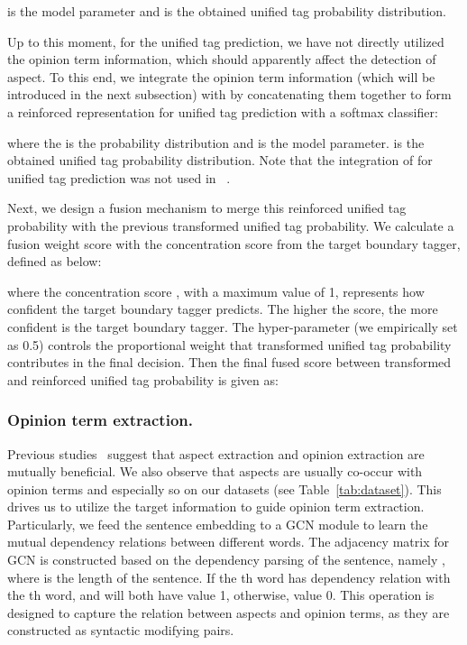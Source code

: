 \documentclass[letterpaper]{article} \usepackage{aaai20}  \usepackage{times}  \usepackage{helvet} \usepackage{courier}  \usepackage[hyphens]{url}  \usepackage{graphicx} \urlstyle{rm} \def\UrlFont{\rm}  \usepackage{graphicx}  \frenchspacing  \setlength{\pdfpagewidth}{8.5in}  \setlength{\pdfpageheight}{11in}
\newcommand{\citet}[1]
{\citeauthor{#1}~\shortcite{#1}}
\begin{document}
 is the model parameter and  is the obtained unified tag probability distribution.


Up to this moment, for the unified tag prediction, we have not directly utilized the opinion term information, which should apparently affect the detection of aspect. To this end, we integrate the opinion term information  (which will be introduced in the next subsection) with   by concatenating them together to form a reinforced representation  for unified tag prediction with a softmax classifier:

where the  is the probability distribution and  is the model parameter.  is the obtained unified tag probability distribution. Note that the integration of  for unified tag prediction was not used in \citet{li2019unified}.



Next, we design a fusion mechanism to merge this reinforced unified tag probability with the previous transformed unified tag probability. We calculate a fusion weight score  with the concentration score  from the target boundary tagger, defined as below:



where the concentration score , with a maximum value of 1, represents how confident the target boundary tagger predicts. The higher the score, the more confident is the target boundary tagger. The hyper-parameter  (we empirically set as 0.5) controls the proportional weight that transformed unified tag probability contributes in the final decision. Then the final fused score between transformed and reinforced unified tag probability is given as:






\subsubsection{Opinion term extraction.}
Previous studies~\cite{wang2017coupled,dai2019neural} suggest that aspect extraction and opinion extraction are mutually beneficial. We also observe that aspects are usually co-occur with opinion terms and especially so on our datasets (see Table~\ref{tab:dataset}). This drives us to utilize the target information to guide opinion term extraction.
Particularly, we feed the sentence embedding to a GCN module to learn the mutual dependency relations between different words. The adjacency matrix for GCN is constructed based on the dependency parsing of the sentence, namely , where  is the length of the sentence. If the th word has dependency relation with the th word,  and  will both have value 1, otherwise, value 0. This operation is designed to capture the relation between aspects and opinion terms, as they are constructed as syntactic modifying pairs.
\end{document}

